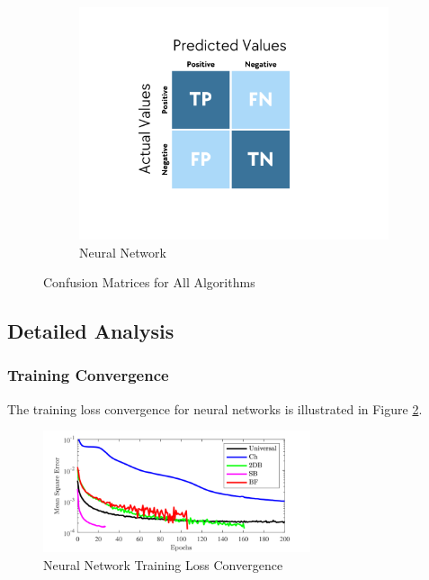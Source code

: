 \begin{figure}[h!]
\begin{subfigure}{0.32\textwidth}
\includegraphics[width=\textwidth]{images/cm_rf.png}
\caption{Neural Network}
\end{subfigure}
\caption{Confusion Matrices for All Algorithms}
\label{fig:confusion_matrices}
\end{figure}

\subsection{Detailed Analysis}

\subsubsection{Training Convergence}

The training loss convergence for neural networks is illustrated in Figure \ref{fig:training_convergence}.

\begin{figure}[h!]
\centering
\includegraphics[width=0.7\textwidth]{images/training_convergence.png}
\caption{Neural Network Training Loss Convergence}
\label{fig:training_convergence}
\end{figure}

